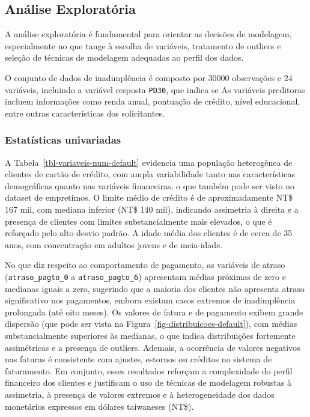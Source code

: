 \documentclass[
  brazilian,
  12pt,
  letterpaper,
  DIV=11,
  numbers=noendperiod]{scrartcl}
\begin{document}
\subsection{Análise Exploratória}\label{anuxe1lise-exploratuxf3ria}

A análise exploratória é fundamental para orientar as decisões de
modelagem, especialmente no que tange à escolha de variáveis, tratamento
de outliers e seleção de técnicas de modelagem adequadas ao perfil dos
dados.

O conjunto de dados de inadimplência é composto por 30000 observações e
24 variáveis, incluindo a variável resposta \texttt{PD30}, que indica se
As variáveis preditoras incluem informações como renda anual, pontuação
de crédito, nível educacional, entre outras características dos
solicitantes.

\subsubsection{Estatísticas
univariadas}\label{estatuxedsticas-univariadas}

A Tabela~\ref{tbl-variaveis-num-default} evidencia uma população
heterogênea de clientes de cartão de crédito, com ampla variabilidade
tanto nas características demográficas quanto nas variáveis financeiras,
o que também pode ser visto no dataset de empretimos. O limite médio de
crédito é de aproximadamente NT\$ 167 mil, com mediana inferior (NT\$
140 mil), indicando assimetria à direita e a presença de clientes com
limites substancialmente mais elevados, o que é reforçado pelo alto
desvio padrão. A idade média dos clientes é de cerca de 35 anos, com
concentração em adultos jovens e de meia-idade.

No que diz respeito ao comportamento de pagamento, as variáveis de
atraso (\texttt{atraso\_pagto\_0} a \texttt{atraso\_pagto\_6})
apresentam médias próximas de zero e medianas iguais a zero, sugerindo
que a maioria dos clientes não apresenta atraso significativo nos
pagamentos, embora existam casos extremos de inadimplência prolongada
(até oito meses). Os valores de fatura e de pagamento exibem grande
dispersão (que pode ser vista na
Figura~\ref{fig-distribuicoes-default}), com médias substancialmente
superiores às medianas, o que indica distribuições fortemente
assimétricas e a presença de outliers. Ademais, a ocorrência de valores
negativos nas faturas é consistente com ajustes, estornos ou créditos no
sistema de faturamento. Em conjunto, esses resultados reforçam a
complexidade do perfil financeiro dos clientes e justificam o uso de
técnicas de modelagem robustas à assimetria, à presença de valores
extremos e à heterogeneidade dos dados monetários expressos em dólares
taiwaneses (NT\$).
\end{document}
